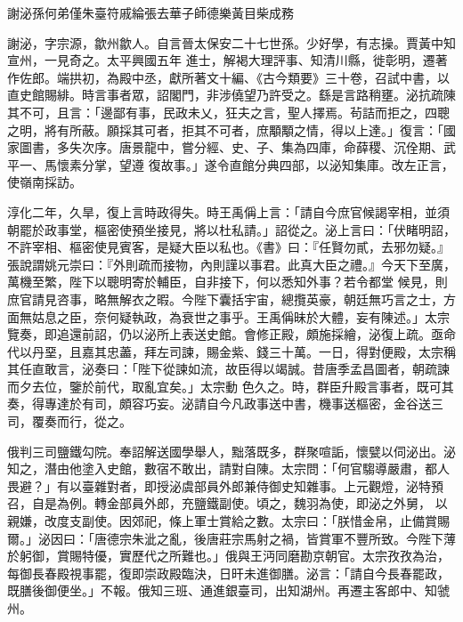 
\begin{pinyinscope}

 謝泌孫何弟僅朱臺符戚綸張去華子師德樂黃目柴成務



 謝泌，字宗源，歙州歙人。自言晉太保安二十七世孫。少好學，有志操。賈黃中知宣州，一見奇之。太平興國五年
 進士，解褐大理評事、知清川縣，徙彰明，遷著作佐郎。端拱初，為殿中丞，獻所著文十編、《古今類要》三十卷，召試中書，以直史館賜緋。時言事者眾，詔閣門，非涉僥望乃許受之。繇是言路稍壅。泌抗疏陳其不可，且言：「邊鄙有事，民政未乂，狂夫之言，聖人擇焉。茍詰而拒之，四聰之明，將有所蔽。願採其可者，拒其不可者，庶顒顒之情，得以上達。」復言：「國家圖書，多失次序。唐景龍中，嘗分經、史、子、集為四庫，命薛稷、沉佺期、武平一、馬懷素分掌，望遵
 復故事。」遂令直館分典四部，以泌知集庫。改左正言，使嶺南採訪。



 淳化二年，久旱，復上言時政得失。時王禹偁上言：「請自今庶官候謁宰相，並須朝罷於政事堂，樞密使預坐接見，將以杜私請。」詔從之。泌上言曰：「伏睹明詔，不許宰相、樞密使見賓客，是疑大臣以私也。《書》曰：『任賢勿貳，去邪勿疑。』張說謂姚元崇曰：『外則疏而接物，內則謹以事君。此真大臣之禮。』今天下至廣，萬機至繁，陛下以聰明寄於輔臣，自非接下，何以悉知外事？若令都堂
 候見，則庶官請見咨事，略無解衣之暇。今陛下囊括宇宙，總攬英豪，朝廷無巧言之士，方面無姑息之臣，奈何疑執政，為衰世之事乎。王禹偁昧於大體，妄有陳述。」太宗覽奏，即追還前詔，仍以泌所上表送史館。會修正殿，頗施採繪，泌復上疏。亟命代以丹堊，且嘉其忠藎，拜左司諫，賜金紫、錢三十萬。一日，得對便殿，太宗稱其任直敢言，泌奏曰：「陛下從諫如流，故臣得以竭誠。昔唐季孟昌圖者，朝疏諫而夕去位，鑒於前代，取亂宜矣。」太宗動
 色久之。時，群臣升殿言事者，既可其奏，得專達於有司，頗容巧妄。泌請自今凡政事送中書，機事送樞密，金谷送三司，覆奏而行，從之。



 俄判三司鹽鐵勾院。奉詔解送國學舉人，黜落既多，群聚喧詬，懷甓以伺泌出。泌知之，潛由他塗入史館，數宿不敢出，請對自陳。太宗問：「何官騶導嚴肅，都人畏避？」有以臺雜對者，即授泌虞部員外郎兼侍御史知雜事。上元觀燈，泌特預召，自是為例。轉金部員外郎，充鹽鐵副使。頃之，魏羽為使，即泌之外舅，
 以親嫌，改度支副使。因郊祀，條上軍士賞給之數。太宗曰：「朕惜金帛，止備賞賜爾。」泌因曰：「唐德宗朱泚之亂，後唐莊宗馬射之禍，皆賞軍不豐所致。今陛下薄於躬御，賞賜特優，實歷代之所難也。」俄與王沔同磨勘京朝官。太宗孜孜為治，每御長春殿視事罷，復即崇政殿臨決，日旰未進御膳。泌言：「請自今長春罷政，既膳後御便坐。」不報。俄知三班、通進銀臺司，出知湖州。再遷主客郎中、知虢州。




\end{pinyinscope}
